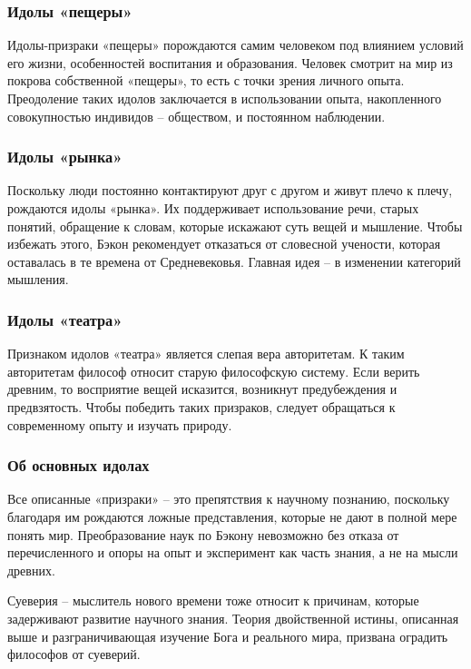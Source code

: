 \documentclass[a4paper, 14pt]{extreport}
\begin{document}
\subsubsection{Идолы «пещеры»}

Идолы-призраки «пещеры» порождаются самим человеком под влиянием условий
его жизни, особенностей воспитания и образования. Человек смотрит на мир
из покрова собственной «пещеры», то есть с точки зрения личного опыта.
Преодоление таких идолов заключается в использовании опыта, накопленного
совокупностью индивидов -- обществом, и постоянном наблюдении.

\subsubsection{Идолы «рынка»}

Поскольку люди постоянно контактируют друг с другом и живут плечо к
плечу, рождаются идолы «рынка». Их поддерживает использование речи,
старых понятий, обращение к словам, которые искажают суть вещей и
мышление. Чтобы избежать этого, Бэкон рекомендует отказаться от
словесной учености, которая оставалась в те времена от Средневековья.
Главная идея -- в изменении категорий мышления.

\subsubsection{Идолы «театра»}

Признаком идолов «театра» является слепая вера авторитетам. К таким
авторитетам философ относит старую философскую систему. Если верить
древним, то восприятие вещей исказится, возникнут предубеждения и
предвзятость. Чтобы победить таких призраков, следует обращаться к
современному опыту и изучать природу.

\subsubsection{Об основных идолах}

Все описанные «призраки» -- это препятствия к научному познанию,
поскольку благодаря им рождаются ложные представления, которые не дают в
полной мере понять мир. Преобразование наук по Бэкону невозможно без
отказа от перечисленного и опоры на опыт и эксперимент как часть знания,
а не на мысли древних.

Суеверия -- мыслитель нового времени тоже относит к причинам, которые
задерживают развитие научного знания. Теория двойственной истины,
описанная выше и разграничивающая изучение Бога и реального мира,
призвана оградить философов от суеверий.
\end{document}
